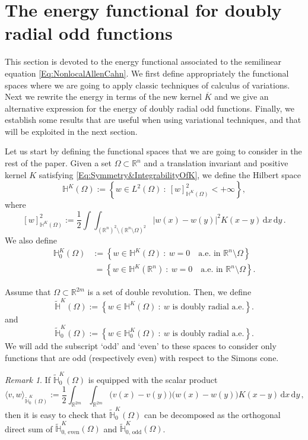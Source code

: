 \documentclass[12pt,reqno]{amsart}
\theoremstyle{definition}
\theoremstyle{remark}
\newtheorem{remark}[theorem]{Remark}
\newcommand{\con}[1]{\mathbb{#1}}
\newcommand{\R}{\con{R}} %
\renewcommand{\H}{\con{H}}
\renewcommand{\d}{\,\mathrm{d}} %
\newcommand{\setcond}[2]{\left \{ #1 \ : \ #2  \right \}}
\numberwithin{equation}{section}
\begin{document}
	
	\section{The energy functional for doubly radial odd functions}
	\label{Sec:EnergyForOddF}
	
	
	This section is devoted to the energy functional associated to the semilinear equation \eqref{Eq:NonlocalAllenCahn}. We first define appropriately the functional spaces where we are going to apply classic techniques of calculus of variations. Next we rewrite the energy in terms of the new kernel $\overline{K}$ and we give an alternative expression for the energy of doubly radial odd functions. Finally, we establish some results that are useful when using variational techniques, and that will be exploited in the next section.
	
	
	Let us start by defining the functional spaces that we are going to consider in the rest of the paper. Given a set $\Omega \subset \R^n$ and a translation invariant and positive kernel $K$ satisfying \eqref{Eq:Symmetry&IntegrabilityOfK}, we define the Hilbert space
	$$
	\H^K(\Omega) := \setcond{w \in L^2(\Omega)}{[w]^2_{\H^K(\Omega)} < + \infty},
	$$
	where
	$$
	[w]^2_{\H^K(\Omega)} := \dfrac{1}{2}\int\int_{(\R^{n})^2 \setminus (\R^n\setminus\Omega)^2} |w(x) - w(y)|^2 K(x-y) \d x \d y\,.
	$$
	We also define
	\begin{align*}
	\H^K_0(\Omega) &:= \setcond{w \in \H^K(\Omega)}{ w = 0 \quad \textrm{a.e. in } \R^n \setminus \Omega} \\
	&\ = \setcond{w \in \H^K(\R^n)}{ w = 0 \quad \textrm{a.e. in } \R^n \setminus \Omega}.
	\end{align*}
	
	Assume that $\Omega \subset \R^{2m}$ is a set of double revolution. Then, we define
	$$
	\widetilde{\H}^K(\Omega) := \setcond{w \in \H^K(\Omega)}{w \textrm{ is doubly radial a.e.}}.
	$$
	and
	$$
	\widetilde{\H}^K_0(\Omega) := \setcond{w \in \H^K_0(\Omega)}{w \textrm{ is doubly radial a.e.}}.
	$$
	We will add the subscript `odd' and `even' to these spaces to consider only functions that are odd (respectively even) with respect to the Simons cone.
	
	
	\begin{remark}
		\label{Remark:DecompositionHK}
		If $\widetilde{\H}^K_0(\Omega)$ is equipped with the scalar product
		$$
		\langle v,w \rangle_{\widetilde{\H}^K_0(\Omega)} := \dfrac{1}{2}\int_{\R^{2m}} \int_{\R^{2m}}  \big(v(x) - v(y)\big)\big(w(x) - w(y)\big) K(x-y) \d x \d y\,,
		$$
		then it is easy to check that $\widetilde{\H}^K_0(\Omega)$ can be decomposed as the orthogonal direct sum of $\widetilde{\H}^K_{0,\, \mathrm{even}}(\Omega)$ and $\widetilde{\H}^K_{0,\,\mathrm{odd}}(\Omega)$.
	\end{remark}
	
\end{document}
